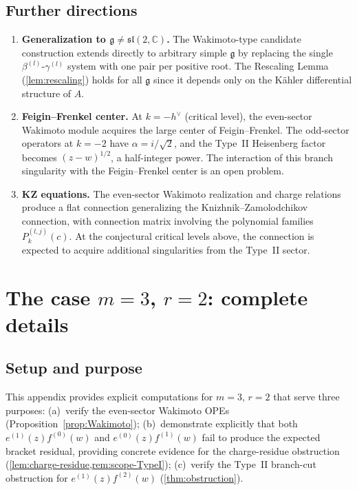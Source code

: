 \documentclass[12pt]{article}
\theoremstyle{plain}
\theoremstyle{definition}
\theoremstyle{remark}
\newcommand{\C}{\mathbb{C}}
\newcommand{\g}{\mathfrak{g}}
\newcommand{\sltwo}{\mathfrak{sl}(2,\C)}
\newcommand{\Plk}[2]{P^{(#1)}_{#2}}
\begin{document}
\subsection{Further directions}
\begin{enumerate}[nosep]
  \item \textbf{Generalization to $\g\neq\sltwo$.}
    The Wakimoto-type candidate construction extends directly to arbitrary
    simple $\g$ by replacing the single $\beta^{(l)}$-$\gamma^{(l)}$ system
    with one pair per positive root.
    The Rescaling Lemma (\cref{lem:rescaling}) holds for all $\g$ since
    it depends only on the Kähler differential structure of $A$.
  \item \textbf{Feigin--Frenkel center.}
    At $k=-h^\vee$ (critical level), the even-sector Wakimoto module acquires
    the large center of Feigin--Frenkel.
    The odd-sector operators at $k=-2$ have $\alpha=i/\sqrt{2}$, and the
    Type~II Heisenberg factor becomes $(z-w)^{1/2}$, a half-integer power.
    The interaction of this branch singularity with the Feigin--Frenkel center
    is an open problem.
  \item \textbf{KZ equations.}
    The even-sector Wakimoto realization and charge relations produce a flat
    connection generalizing the Knizhnik--Zamolodchikov connection, with
    connection matrix involving the polynomial families $\Plk{l,j}{k}(c)$.
    At the conjectural critical levels above, the connection is expected to
    acquire additional singularities from the Type~II sector.
\end{enumerate}
\appendix
\section{The case \texorpdfstring{$m=3$, $r=2$}{m=3, r=2}: complete details}\label{app:m3}
\subsection{Setup and purpose}
This appendix provides explicit computations for $m=3$, $r=2$ that serve
three purposes:
(a)~verify the even-sector Wakimoto OPEs (Proposition~\ref{prop:Wakimoto});
(b)~demonstrate explicitly that both $e^{(1)}(z)f^{(0)}(w)$ and
$e^{(0)}(z)f^{(1)}(w)$ fail to produce the expected bracket residual,
providing concrete evidence for the charge-residue obstruction
(\cref{lem:charge-residue,rem:scope-TypeI});
(c)~verify the Type~II branch-cut obstruction for $e^{(1)}(z)f^{(2)}(w)$
(\cref{thm:obstruction}).
\end{document}
